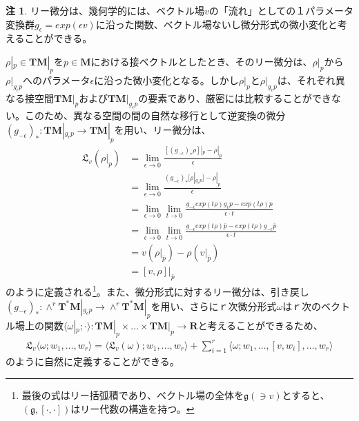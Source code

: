 \documentclass[a4paper, 11pt]{report}
\theoremstyle{definition}
\newtheorem*{remark*}{注}
\begin{document}
\begin{remark*}
 リー微分は、幾何学的には、ベクトル場$v$の「流れ」としての１パラメータ変換群$g_\epsilon =exp(\epsilon v)$に沿った関数、ベクトル場ないし微分形式の微小変化と考えることができる。

 $\rho|_p\in\mathbf{TM}|_p$を$p\in\mathbf{M}$における接ベクトルとしたとき、そのリー微分は、$\rho|_p$から$\rho|_{g_\epsilon p}$へのパラメータ$\epsilon$に沿った微小変化となる。しかし$\rho|_p$と$\rho|_{g_\epsilon p}$は、それぞれ異なる接空間$\mathbf{TM}|_p$および$\mathbf{TM}|_{g_\epsilon p}$の要素であり、厳密には比較することができない。このため、異なる空間の間の自然な移行として逆変換の微分$(g_{-\epsilon})_*:\mathbf{TM}|_{g_\epsilon p}\longrightarrow\mathbf{TM}|_p$を用い、リー微分は、
\begin{align*}
\mathfrak{L}_v(\rho|_p) &= \lim_{\epsilon\to 0} \frac{[(g_{-\epsilon})_* \rho]|_p - \rho|_p}{\epsilon}\\
&= \lim_{\epsilon\to 0} \frac{(g_{-\epsilon})_*[\rho|_{g_\epsilon p}] - \rho|_p}{\epsilon}\\
&= \lim_{\epsilon\to 0} \lim_{t\to 0} \frac{g_{-\epsilon} exp(t\rho) g_\epsilon p - exp(t\rho) p}{\epsilon\cdot t}\\
&= \lim_{\epsilon\to 0} \lim_{t\to 0} \frac{g_{-\epsilon} exp(t\rho) \bar{p} - exp(t\rho) g_{-\epsilon} \bar{p}}{\epsilon\cdot t}\\
&= v(\rho |_{\bar{p}})-\rho (v|_{\bar{p}})\\
&= [v,\rho ]|_{\bar{p}}
\end{align*}
のように定義される\footnote{最後の式はリー括弧積であり、ベクトル場の全体を$\mathfrak{g}(\ni v)$とすると、$(\mathfrak{g}, [\cdot,\cdot])$はリー代数の構造を持つ。}。また、微分形式に対するリー微分は、引き戻し$(g_{-\epsilon})_*:\wedge^r\mathbf{T}^*\mathbf{M}|_{g_\epsilon p}\longrightarrow \wedge^r\mathbf{T}^*\mathbf{M}|_p$を用い、さらにｒ次微分形式$\omega$はｒ次のベクトル場上の関数$\langle \omega|_p ;\cdot \rangle :\mathbf{TM}|_p\times\dots\times\mathbf{TM}|_p\longrightarrow\mathbf{R}$と考えることができるため、
\begin{align*}
\mathfrak{L}_v \langle \omega ; w_1,\dots ,w_r \rangle = \langle \mathfrak{L}_v(\omega);w_1,\dots ,w_r \rangle + \sum_{i=1}^r \langle \omega;w_1,\dots ,[v,w_i],\dots ,w_r \rangle
\end{align*}
のように自然に定義することができる。
\end{remark*}
\end{document}

